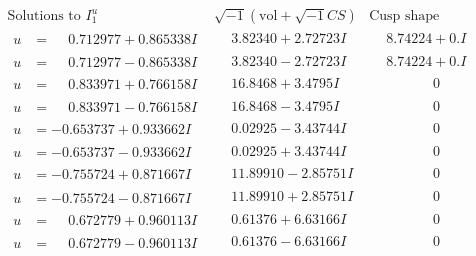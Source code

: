 \documentclass[1p]{elsarticle_modified}
\theoremstyle{definition}
\newcommand{\I}{\sqrt{-1}}
\begin{document}
$$\begin{array}{c|c|c}
\text{Solutions to }I^u_{1}& \I (\text{vol} + \sqrt{-1}CS) & \text{Cusp shape}\\
 \hline 
\begin{aligned}
u &= \phantom{-}0.712977 + 0.865338 I\end{aligned}
 & \phantom{-}3.82340 + 2.72723 I & \phantom{-}8.74224 + 0. I\phantom{ +0.000000I} \\ \hline\begin{aligned}
u &= \phantom{-}0.712977 - 0.865338 I\end{aligned}
 & \phantom{-}3.82340 - 2.72723 I & \phantom{-}8.74224 + 0. I\phantom{ +0.000000I} \\ \hline\begin{aligned}
u &= \phantom{-}0.833971 + 0.766158 I\end{aligned}
 & \phantom{-}16.8468 + 3.4795 I & \phantom{-0.000000 } 0 \\ \hline\begin{aligned}
u &= \phantom{-}0.833971 - 0.766158 I\end{aligned}
 & \phantom{-}16.8468 - 3.4795 I & \phantom{-0.000000 } 0 \\ \hline\begin{aligned}
u &= -0.653737 + 0.933662 I\end{aligned}
 & \phantom{-}0.02925 - 3.43744 I & \phantom{-0.000000 } 0 \\ \hline\begin{aligned}
u &= -0.653737 - 0.933662 I\end{aligned}
 & \phantom{-}0.02925 + 3.43744 I & \phantom{-0.000000 } 0 \\ \hline\begin{aligned}
u &= -0.755724 + 0.871667 I\end{aligned}
 & \phantom{-}11.89910 - 2.85751 I & \phantom{-0.000000 } 0 \\ \hline\begin{aligned}
u &= -0.755724 - 0.871667 I\end{aligned}
 & \phantom{-}11.89910 + 2.85751 I & \phantom{-0.000000 } 0 \\ \hline\begin{aligned}
u &= \phantom{-}0.672779 + 0.960113 I\end{aligned}
 & \phantom{-}0.61376 + 6.63166 I & \phantom{-0.000000 } 0 \\ \hline\begin{aligned}
u &= \phantom{-}0.672779 - 0.960113 I\end{aligned}
 & \phantom{-}0.61376 - 6.63166 I & \phantom{-0.000000 } 0 \\ \hline\begin{aligned}

\end{aligned}
\end{array}$$
\end{document}
